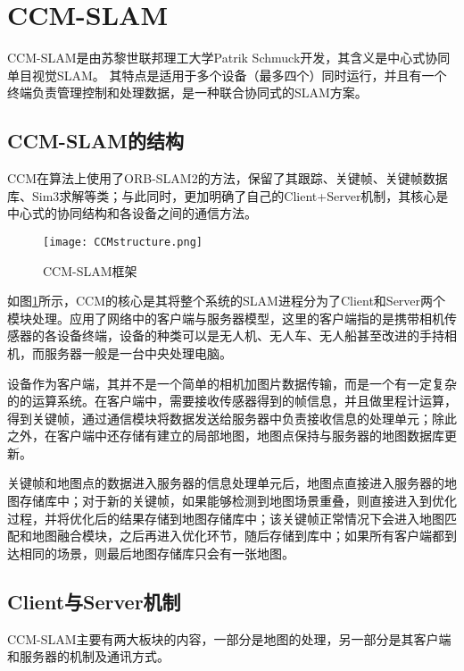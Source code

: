 \section{CCM-SLAM}

CCM-SLAM是由苏黎世联邦理工大学Patrik Schmuck开发，其含义是中心式协同单目视觉SLAM。
其特点是适用于多个设备（最多四个）同时运行，并且有一个终端负责管理控制和处理数据，是一种联合协同式的SLAM方案。

\subsection{CCM-SLAM的结构} \label{3.3.1}

CCM在算法上使用了ORB-SLAM2的方法，保留了其跟踪、关键帧、关键帧数据库、Sim3求解等类；与此同时，更加明确了自己的Client+Server机制，其核心是中心式的协同结构和各设备之间的通信方法。

\begin{figure}[!ht]
	\centering
	\texttt{[image: CCMstructure.png]}
	\caption{CCM-SLAM框架}
	\label{fig11}
\end{figure}

如图\ref{fig11}所示，CCM的核心是其将整个系统的SLAM进程分为了Client和Server两个模块处理。应用了网络中的客户端与服务器模型，这里的客户端指的是携带相机传感器的各设备终端，设备的种类可以是无人机、无人车、无人船甚至改进的手持相机，而服务器一般是一台中央处理电脑。

设备作为客户端，其并不是一个简单的相机加图片数据传输，而是一个有一定复杂的的运算系统。在客户端中，需要接收传感器得到的帧信息，并且做里程计运算，得到关键帧，通过通信模块将数据发送给服务器中负责接收信息的处理单元；除此之外，在客户端中还存储有建立的局部地图，地图点保持与服务器的地图数据库更新。

关键帧和地图点的数据进入服务器的信息处理单元后，地图点直接进入服务器的地图存储库中；对于新的关键帧，如果能够检测到地图场景重叠，则直接进入到优化过程，并将优化后的结果存储到地图存储库中；该关键帧正常情况下会进入地图匹配和地图融合模块，之后再进入优化环节，随后存储到库中；如果所有客户端都到达相同的场景，则最后地图存储库只会有一张地图\cite{schmuck2019ccm}。

\subsection{Client与Server机制} \label{3.3.2}

CCM-SLAM主要有两大板块的内容，一部分是地图的处理，另一部分是其客户端和服务器的机制及通讯方式。

